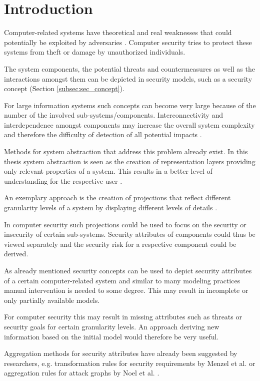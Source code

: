 \section{Introduction}

Computer-related systems have theoretical and real weaknesses that could potentially be exploited by adversaries \cite{Pfleeger:2006:SC:1177321}. Computer security tries to protect these systems from theft or damage by unauthorized individuals. 

The system components, the potential threats and countermeasures as well as the interactions amongst them can be depicted in security models, such as a security concept (Section \ref{subsec:sec_concept}).

For large information systems such concepts can become very large because of the number of the involved sub-systems/components. Interconnectivity and interdependence amongst components may increase the overall system complexity and therefore the difficulty of detection of all potential impacts \cite{branagan}.

Methods for system abstraction that address this problem already exist. In this thesis system abstraction is seen as the creation of representation layers providing only relevant properties of a system. This results in a better level of understanding for the respective user \cite{pohl}. 

An exemplary approach is the creation of projections that reflect different granularity levels of a system by displaying different levels of details \cite{thyssen2010system}.

In computer security such projections could be used to focus on the security or insecurity of certain sub-systems. Security attributes of components could thus be viewed separately and the security risk for a respective component could be derived. 

As already mentioned security concepts can be used to depict security attributes of a certain computer-related system and similar to many modeling practices manual intervention is needed to some degree. This may result in incomplete or only partially available models. 

For computer security this may result in missing attributes such as threats or security goals for certain granularity levels. An approach deriving new information based on the initial model would therefore be very useful.

Aggregation methods for security attributes have already been suggested by researchers, e.g. transformation rules for security requirements by Menzel et al. \cite{Menzel2008} or aggregation rules for attack graphs by Noel et al. \cite{Noel:2004:MAG:1029208.1029225}. 

